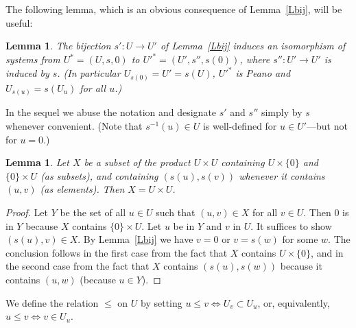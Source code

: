 \documentclass[12pt,letterpaper]{article}
\newtheorem{lem}[thm]{Lemma} %
\begin{document}
The following lemma, which is an obvious consequence of Lemma~\ref{Lbij}, will be useful: 

\begin{lem}\label{Liso} 
The bijection \(s':U\to U'\) of Lemma~\ref{Lbij} induces an isomorphism of systems from \(U^*=(U,s,0)\) to \(U'^*=(U',s'',s(0))\), where \(s'':U'\to U'\) is induced by \(s\). (In particular \(U_{s(0)}=U'=s(U)\), \(U'^*\) is Peano and \(U_{s(u)}=s(U_u)\) for all \(u\).) 
\end{lem} 

In the sequel we abuse the notation and designate \(s'\) and \(s''\) simply by \(s\) whenever convenient. (Note that \(s^{-1}(u)\in U\) is well-defined for \(u\in U'\)---but not for \(u=0\).) 

\begin{lem}\label{Lgen} 
Let \(X\) be a subset of the product \(U\times U\) containing \(U\times\{0\}\) and \(\{0\}\times U\) (as subsets), and containing \((s(u),s(v))\) whenever it contains \((u,v)\) (as elements). Then \(X=U\times U\). 
\end{lem} 
\begin{proof} 
Let \(Y\) be the set of all \(u\in U\) such that \((u,v)\in X\) for all \(v\in U\). Then \(0\) is in \(Y\) because \(X\) contains \(\{0\}\times U\). Let \(u\) be in \(Y\) and \(v\) in \(U\). It suffices to show \((s(u),v)\in X\). By Lemma~\ref{Lbij} we have \(v=0\) or \(v=s(w)\) for some \(w\). The conclusion follows in the first case from the fact that \(X\) contains \(U\times\{0\}\), and in the second case from the fact that \(X\) contains \((s(u),s(w))\) because it contains \((u,w)\) (because \(u\in Y\)). 
\end{proof} 

We define the relation \(\le\) on \(U\) by setting \(u\le v\Leftrightarrow U_v\subset U_u\), or, equivalently, \(u\le v\Leftrightarrow v\in U_u\). 
\end{document}

